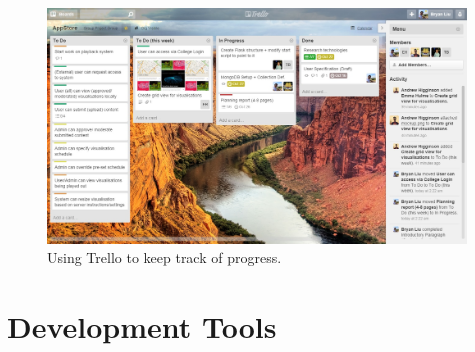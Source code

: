 \documentclass[a4paper]{article}
\begin{document}
\begin{figure}[ht]
  \centering
    \includegraphics[width = 0.99\textwidth]{./planning/trello.jpg}
   
  \caption{Using Trello to keep track of progress.}
  \label{fig:trello}
\end{figure}

\section{Development Tools}
\end{document}
